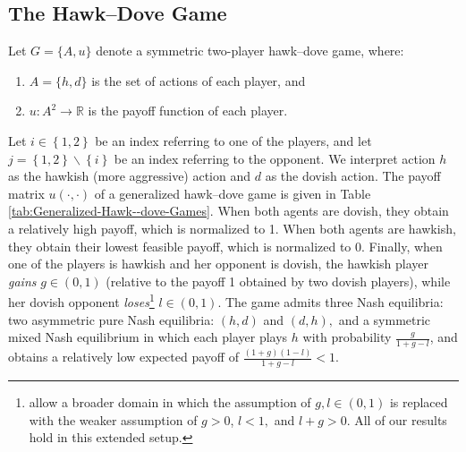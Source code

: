 \documentclass[12pt]{article}
\numberwithin{equation}{section}
\numberwithin{figure}{section}
\theoremstyle{definition}
\theoremstyle{plain}
\theoremstyle{plain}
\theoremstyle{plain}
\theoremstyle{remark}
\theoremstyle{plain}
\theoremstyle{plain}
\begin{document}
\subsection{The Hawk--Dove Game}
Let $G=\{A,u\}$ denote a symmetric two-player hawk--dove game, where: 
\begin{enumerate}
\item $A=\{h,d\}$
is the set of actions of each player, and 
\item $u:A^2\rightarrow\mathbb{R}$
is the payoff function of each player.
 \end{enumerate}
Let $i\in\left\{ 1,2\right\} $ be an index referring to one of the
players, and let $j=\left\{ 1,2\right\} \backslash\left\{ i\right\} $
be an index referring to the opponent. We interpret action $h$
as the hawkish (more aggressive) action and $d$ as the dovish
action. The payoff matrix $u(\cdot,\cdot)$ of a generalized hawk--dove game is given in Table \ref{tab:Generalized-Hawk--dove-Games}.
When both agents are dovish, they obtain a relatively high payoff, which is normalized to 1. When both agents are hawkish, they obtain their lowest feasible payoff, which is normalized to 0. 
Finally, when one of the players is hawkish and her opponent is dovish, the hawkish player \emph{gains}  $g\in(0,1)$ (relative to the payoff 1 obtained by two dovish players), while her dovish opponent \emph{loses}\footnote{\cite{herold2020evolution} allow a broader 
domain in which the assumption of $g,l\in(0,1)$ is replaced with the weaker assumption of
$g>0$, $l<1,$ and $l+g>0$. All of our results hold in this extended setup.
} $l\in(0,1)$. 
The game admits three Nash equilibria: two asymmetric pure Nash equilibria: $(h,d)$ and $(d,h),$ and a symmetric mixed Nash equilibrium in which each player plays $h$ with probability $\frac{g}{1+g-l}$,
and obtains a relatively low expected payoff of $\frac{(1+g)(1-l)}{1+g-l}<1$.
\end{document}
